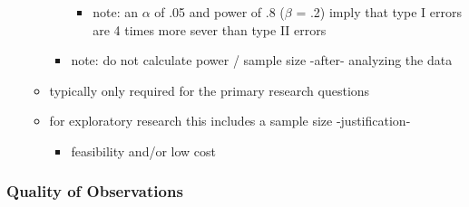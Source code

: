 \documentclass[]{article}
\providecommand{\tightlist}{%
  \setlength{\itemsep}{0pt}\setlength{\parskip}{0pt}}
\begin{document}
\begin{itemize}
\begin{itemize}
\begin{itemize}
      \begin{itemize}
      \tightlist
      \item
        note: an \(\alpha\) of .05 and power of .8 (\(\beta\) = .2)
        imply that type I errors are 4 times more sever than type II
        errors
      \end{itemize}
    \item
      note: do not calculate power / sample size -after- analyzing the
      data
    \end{itemize}
  \item
    typically only required for the primary research questions
  \item
    for exploratory research this includes a sample size -justification-

    \begin{itemize}
    \tightlist
    \item
      feasibility and/or low cost
    \end{itemize}
  \end{itemize}
\end{itemize}

\subsubsection{Quality of Observations}\label{quality-of-observations}
\end{document}
